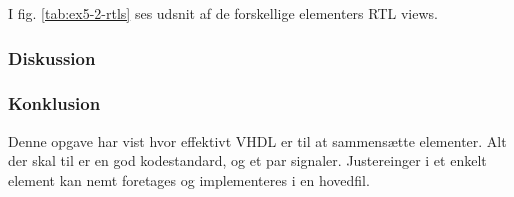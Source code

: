 {I fig. \ref{tab:ex5-2-rtls} ses udsnit af de forskellige elementers RTL views.




\subsubsection{Diskussion}
\subsubsection{Konklusion}
}

Denne opgave har vist hvor effektivt VHDL er til at sammensætte elementer. Alt der skal til er en god kodestandard, og et par signaler. Justereinger i et enkelt element kan nemt foretages og implementeres i en hovedfil.